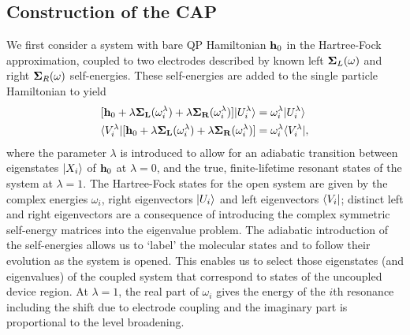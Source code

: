 \subsection{Construction of the \ac{CAP}}
We first consider a system with bare \ac{QP} Hamiltonian $\mathbf{h}_0$ in the
Hartree-Fock approximation, coupled to two electrodes described by known
left $\mathbf{\Sigma}_L(\omega)$ and right $\mathbf{\Sigma}_R(\omega)$ self-energies.
These self-energies are added to the single particle
Hamiltonian to yield
\numparts
\begin{eqnarray}
\label{eq:capseq}
        [\mathbf{h}_0 + \lambda \mathbf{\Sigma_L}(\omega_i^\lambda)
            +\lambda \mathbf{\Sigma_R}(\omega_i^\lambda)] |U_i^\lambda \rangle
        &= \omega_i^\lambda |U_i^\lambda \rangle \\
        \langle V_i^\lambda| [\mathbf{h}_0 + \lambda \mathbf{\Sigma_L}(\omega_i^\lambda)
            +\lambda \mathbf{\Sigma_R}(\omega_i^\lambda)]
        &= \omega_i^\lambda \langle V_i^\lambda|,
        \label{eq:adiabaticap}
\end{eqnarray}
\endnumparts
where the parameter $\lambda$ is introduced to allow for an adiabatic
transition between eigenstates $|X_i \rangle$ of $\mathbf{h}_0$ at $\lambda = 0$,
and the true, finite-lifetime resonant states of the system at
$\lambda = 1$. The Hartree-Fock states for the open system are given by
the complex energies $\omega_i$, right eigenvectors $|U_i \rangle$ and left
eigenvectors $\langle V_i|$; distinct left and right eigenvectors are a
consequence of introducing the complex symmetric self-energy matrices into
the eigenvalue problem.
The adiabatic introduction of the self-energies allows
us to `label' the molecular states and to follow their evolution as the
system is opened. This enables us to select those eigenstates (and
eigenvalues) of the coupled system that correspond to states of the
uncoupled device region. At $\lambda=1$, the real part of $\omega_i$
gives the energy of the $i$th resonance including the shift due to
electrode coupling and the imaginary part is proportional to the level
broadening.

